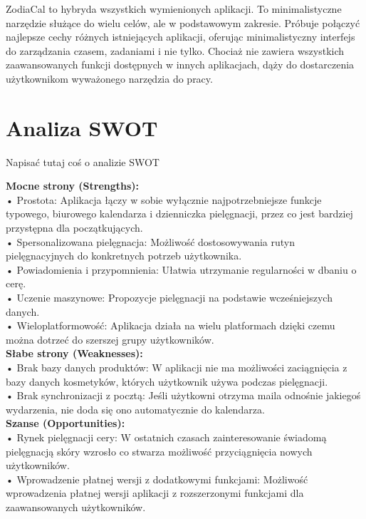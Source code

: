ZodiaCal to hybryda wszystkich wymienionych aplikacji.
To minimalistyczne narzędzie służące do wielu celów, ale w podstawowym zakresie.
Próbuje połączyć najlepsze cechy różnych istniejących aplikacji,
oferując minimalistyczny interfejs do zarządzania czasem, zadaniami i nie tylko.
Chociaż nie zawiera wszystkich zaawansowanych funkcji dostępnych w innych aplikacjach,
dąży do dostarczenia użytkownikom wyważonego narzędzia do pracy.


\section{Analiza SWOT}
Napisać tutaj coś o analizie SWOT

\phantom{Th}

\textbf{Mocne strony (Strengths):}\\
•	Prostota: Aplikacja łączy w sobie wyłącznie najpotrzebniejsze funkcje typowego, biurowego kalendarza i dzienniczka pielęgnacji, przez co jest bardziej przystępna dla początkujących.\\
•	Spersonalizowana pielęgnacja: Możliwość dostosowywania rutyn pielęgnacyjnych do konkretnych potrzeb użytkownika.\\
•	Powiadomienia i przypomnienia: Ułatwia utrzymanie regularności w dbaniu o cerę.\\
•	Uczenie maszynowe: Propozycje pielęgnacji na podstawie wcześniejszych danych.\\
•	Wieloplatformowość: Aplikacja działa na wielu platformach dzięki czemu można dotrzeć do szerszej grupy użytkowników.\\

\textbf{Słabe strony (Weaknesses):}\\
•	Brak bazy danych produktów: W aplikacji nie ma możliwości zaciągnięcia z bazy danych kosmetyków, których użytkownik używa podczas pielęgnacji.\\
•	Brak synchronizacji z pocztą: Jeśli użytkowni otrzyma maila odnośnie jakiegoś wydarzenia, nie doda się ono automatycznie do kalendarza.\\

\textbf{Szanse (Opportunities):}\\
•	Rynek pielęgnacji cery: W ostatnich czasach zainteresowanie świadomą pielęgnacją skóry wzrosło co stwarza możliwość przyciągnięcia nowych użytkowników.\\
•	Wprowadzenie płatnej wersji z dodatkowymi funkcjami: Możliwość wprowadzenia płatnej wersji aplikacji z rozszerzonymi funkcjami dla zaawansowanych użytkowników.\\

